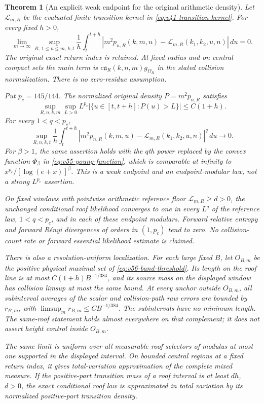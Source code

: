 \documentclass[11pt,reqno]{amsart}
\numberwithin{equation}{section}
\newtheorem{leadtheorem}{Theorem}
\theoremstyle{definition}\newtheorem{definition}[theorem]{Definition}
\theoremstyle{remark}\newtheorem{remark}[theorem]{Remark}
\begin{document}
\begin{leadtheorem}[An explicit weak endpoint for the original arithmetic density]
\label{thm:intro-v49-local-TV}
Let $\mathcal L_{m,R}$ be the evaluated finite transition kernel in
\eqref{eq:v41-transition-kernel}. For every fixed $h>0$,
\[
 \lim_{m\to\infty}\sup_{R,\,1\le n\le m,\,k,t}
 \frac1h\int_t^{t+h}
 |m^2p_{n,R}(k,m,u)-\mathcal L_{m,R}(k_1,k_2,u,n)|\,du=0.
\]
The original exact return index is retained. At fixed radius and on
central compact sets the main term is
$c\mathfrak a_R(k,n,m)g_{\Omega_R}$ in the stated collision
normalization. There is no zero-residue assumption.

Put $p_c=145/144$. The normalized original density $P=m^2p_{n,R}$
satisfies
\[
 \sup_{R,n,k,m}\sup_{L>0} L^{p_c}
    |\{u\in[t,t+h]:P(u)>L\}|\le C(1+h).
\]
For every $1<q<p_c$,
\[
 \sup_{R,n,k,t}\frac1h\int_t^{t+h}
 |m^2p_{n,R}(k,m,u)-\mathcal L_{m,R}(k_1,k_2,u,n)|^q\,du\to0.
\]
For $\beta>1$, the same assertion holds with the $q$th power replaced
by the convex function $\Phi_\beta$ in
\eqref{eq:v55-young-function}, which is comparable at infinity to
$x^{p_c}/[\log(e+x)]^\beta$. This is a weak endpoint and an
endpoint-modular law, not a strong $L^{p_c}$ assertion.

On fixed windows with pointwise arithmetic reference floor
$\mathcal L_{m,R}\ge d>0$, the unchanged conditional roof likelihood
converges to one in every $L^q$ of the reference law, $1<q<p_c$,
and in each of these endpoint modulars. Forward relative entropy
and forward R\'enyi divergences of orders in $(1,p_c)$ tend to zero.
No collision-count rate or forward essential likelihood estimate
is claimed.

There is also a resolution-uniform localization. For each large fixed
$B$, let $O_{B,m}$ be the positive physical maximal set of
\eqref{eq:v56-band-threshold}. Its length on the roof line is at most
$C(1+h)B^{-1/384}$, and its source mass on the displayed window has
collision limsup at most the same bound. At every anchor outside
$O_{B,m}$, all subinterval averages of the scalar and collision-path
raw errors are bounded by $r_{B,m}$, with
$\limsup_m r_{B,m}\le CB^{-1/384}$. The subintervals have no minimum
length. The same-roof statement holds almost everywhere on that
complement; it does not assert height control inside $O_{B,m}$.

The same limit is uniform over all measurable roof selectors of
modulus at most one supported in the displayed interval. On bounded
central regions at a fixed return index, it gives total-variation
approximation of the complete mixed measure. If the positive-part
transition mass of a roof interval is at least $dh$, $d>0$, the exact
conditional roof law is approximated in total variation by its
normalized positive-part transition density.
\end{leadtheorem}
\end{document}
